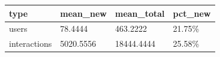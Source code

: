 \begin{tabular}{llll}
\toprule
type & mean_new & mean_total & pct_new \\
\midrule
users & 78.4444 & 463.2222 & 21.75\% \\
interactions & 5020.5556 & 18444.4444 & 25.58\% \\
\bottomrule
\end{tabular}
